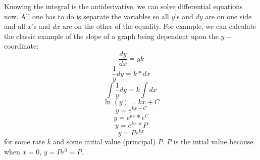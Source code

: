 \documentclass[../revisedmain.tex]{subfiles}
\begin{document}
Knowing the integral is the antiderivative, we can solve differential equations now. All one has to do is separate the variables so all $y$'s and $dy$ are on one side and all $x$'s and $dx$ are on the other of the equality. For example, we can calculate the classic example of the slope of a graph being dependent upon the $y-$coordinate:$$\frac{dy}{dx}=yk$$$$\frac{1}{y}dy=k*dx$$$$\int\frac{1}{y}dy=k\int dx$$$$\ln(y)=kx+C$$$$y=e^{kx+C}$$$$y=e^{kx}*e^C$$$$y=e^{kx}*P$$$$y=Pe^{kx}$$ for some rate \textit{k} and some initial value (principal) $P$. $P$ is the intial value because when $x=0$, $y=Pe^{0}=P$.
\end{document}
